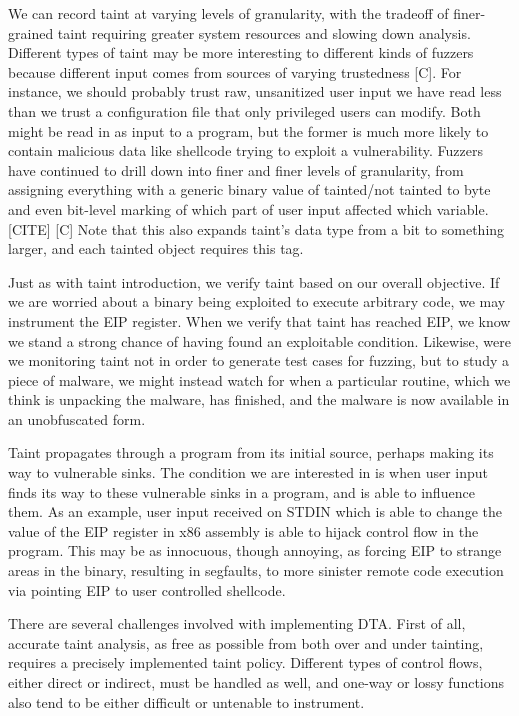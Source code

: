\documentclass[11pt,expanded,copyright]{fsuthesis}
\begin{document}
We can record taint at varying levels of granularity, with the tradeoff of finer-grained taint requiring greater system resources and slowing down analysis. Different types of taint may be more interesting to different kinds of fuzzers because different input comes from sources of varying trustedness [C]. For instance, we should probably trust raw, unsanitized user input we have read less than we trust a configuration file that only privileged users can modify. Both might be read in as input to a program, but the former is much more likely to contain malicious data like shellcode trying to exploit a vulnerability. Fuzzers have continued to drill down into finer and finer levels of granularity, from assigning everything with a generic binary value of tainted/not tainted to byte and even bit-level marking of which part of user input affected which variable. [CITE] [C] Note that this also expands taint's data type from a bit to something larger, and each tainted object requires this tag.

Just as with taint introduction, we verify taint based on our overall objective. If we are worried about a binary being exploited to execute arbitrary code, we may instrument the EIP register. When we verify that taint has reached EIP, we know we stand a strong chance of having found an exploitable condition. Likewise, were we monitoring taint not in order to generate test cases for fuzzing, but to study a piece of malware, we might instead watch for when a particular routine, which we think is unpacking the malware, has finished, and the malware is now available in an unobfuscated form.

Taint propagates through a program from its initial source, perhaps making its way to vulnerable sinks. The condition we are interested in is when user input finds its way to these vulnerable sinks in a program, and is able to influence them. As an example, user input received on STDIN which is able to change the value of the EIP register in x86 assembly is able to hijack control flow in the program. This may be as innocuous, though annoying, as forcing EIP to strange areas in the binary, resulting in segfaults, to more sinister remote code execution via pointing EIP to user controlled shellcode.

There are several challenges involved with implementing DTA. First of all, accurate taint analysis, as free as possible from both over and under tainting, requires a precisely implemented taint policy. Different types of control flows, either direct or indirect, must be handled as well, and one-way or lossy functions also tend to be either difficult or untenable to instrument.
\end{document}
